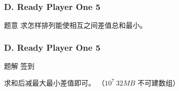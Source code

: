 \renewcommand{\problemname}{D. Ready Player One 5}

\begin{frame}\frametitle{\problemname}
	
	\begin{block}{题意}
		求怎样排列能使相互之间差值总和最小。
	\end{block}
\end{frame}

\begin{frame}\frametitle{\problemname}
	
	\begin{block}{题解}
		签到
		
		求和后减最大最小差值即可。
		（$10^7\ 32MB$ 不可建数组）
	\end{block}
\end{frame}